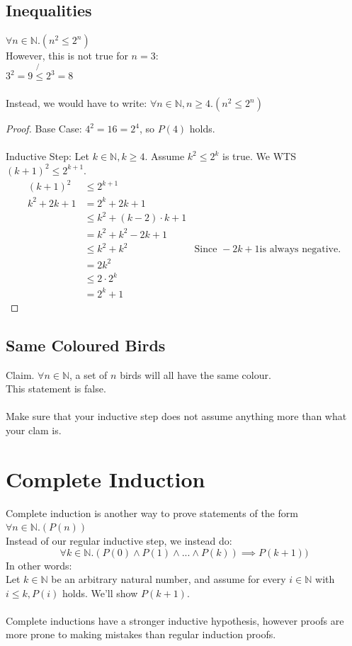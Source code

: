 \documentclass{article}
\begin{document}
\subsection{Inequalities}
$\forall n \in \mathbb{N}. (n^2 \leq 2^n)$\\
However, this is not true for $n = 3$:\\
$3^2 = 9 \not{\leq} 2^3 = 8$
\\
\\
Instead, we would have to write: $\forall n \in \mathbb{N}, n \geq 4. (n^2 \leq 2^n)$
\begin{proof}
Base Case: $4^2 = 16 = 2^4$, so $P(4)$ holds.\\
\\
Inductive Step: Let $k \in \mathbb{N}, k \geq 4$. Assume $k^2 \leq 2^k$ is true. We WTS $(k + 1)^2 \leq 2^{k + 1}$.
\begin{align*}
    (k + 1)^2 & \leq 2^{k + 1}\\
    k^2 + 2k + 1 & = 2^k + 2k + 1\\
    & \leq k^2 + (k - 2) \cdot k + 1\\
    & = k^2 + k^2 - 2k + 1\\
    & \leq k^2 + k^2 & \text{Since }-2k + 1 \text{is always negative.}\\
    & = 2k^2 \\
    & \leq 2 \cdot 2^k\\
    & = 2^k + 1
\end{align*}
\end{proof}
\subsection{Same Coloured Birds}
Claim. $\forall n \in \mathbb{N}$, a set of $n$ birds will all have the same colour.\\
This statement is false.\\
\\
Make sure that your inductive step does not assume anything more than what your clam is.
\section{Complete Induction}
Complete induction is another way to prove statements of the form $\forall n \in \mathbb{N}.(P(n))$\\
Instead of our regular inductive step, we instead do:
$$\forall k \in \mathbb{N}.(P(0) \land P(1) \land ... \land P(k)) \implies P(k + 1))$$
In other words:\\
Let $k \in \mathbb{N}$ be an arbitrary natural number, and assume for every $i \in \mathbb{N}$ with $i \leq k, P(i)$ holds. We'll show $P(k + 1)$.\\
\\
Complete inductions have a stronger inductive hypothesis, however proofs are more prone to making mistakes than regular induction proofs.
\end{document}
